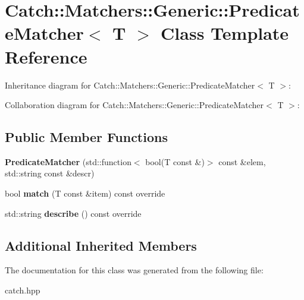 \hypertarget{classCatch_1_1Matchers_1_1Generic_1_1PredicateMatcher}{}\section{Catch\+:\+:Matchers\+:\+:Generic\+:\+:Predicate\+Matcher$<$ T $>$ Class Template Reference}
\label{classCatch_1_1Matchers_1_1Generic_1_1PredicateMatcher}


Inheritance diagram for Catch\+:\+:Matchers\+:\+:Generic\+:\+:Predicate\+Matcher$<$ T $>$\+:


Collaboration diagram for Catch\+:\+:Matchers\+:\+:Generic\+:\+:Predicate\+Matcher$<$ T $>$\+:
\subsection*{Public Member Functions}
\begin{DoxyCompactItemize}
\item 
\mbox{\label{classCatch_1_1Matchers_1_1Generic_1_1PredicateMatcher_a57d53ef028c2f7b92b016f627f91aa76}} 
{\bfseries Predicate\+Matcher} (std\+::function$<$ bool(T const \&)$>$ const \&elem, std\+::string const \&descr)
\item 
\mbox{\label{classCatch_1_1Matchers_1_1Generic_1_1PredicateMatcher_a2ec0e8ec19c4c5e26271d59a06a62b52}} 
bool {\bfseries match} (T const \&item) const override
\item 
\mbox{\label{classCatch_1_1Matchers_1_1Generic_1_1PredicateMatcher_af7d59e94892cc09471bbaefac4c889fd}} 
std\+::string {\bfseries describe} () const override
\end{DoxyCompactItemize}
\subsection*{Additional Inherited Members}


The documentation for this class was generated from the following file\+:\begin{DoxyCompactItemize}
\item 
catch.\+hpp\end{DoxyCompactItemize}
